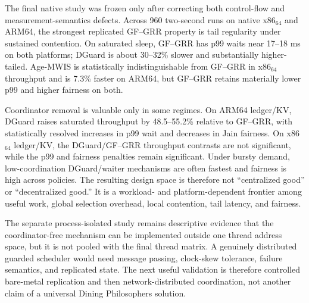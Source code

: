 \documentclass[10pt,journal]{IEEEtran}
\begin{document}
The final native study was frozen only after correcting both control-flow and measurement-semantics defects. Across 960 two-second runs on native x86$_{64}$ and ARM64, the strongest replicated GF--GRR property is tail regularity under sustained contention. On saturated sleep, GF--GRR has p99 waits near 17--18 ms on both platforms; DGuard is about 30--32\% slower and substantially higher-tailed. Age-MWIS is statistically indistinguishable from GF--GRR in x86$_{64}$ throughput and is 7.3\% faster on ARM64, but GF--GRR retains materially lower p99 and higher fairness on both.

Coordinator removal is valuable only in some regimes. On ARM64 ledger/KV, DGuard raises saturated throughput by 48.5--55.2\% relative to GF--GRR, with statistically resolved increases in p99 wait and decreases in Jain fairness. On x86$_{64}$ ledger/KV, the DGuard/GF--GRR throughput contrasts are not significant, while the p99 and fairness penalties remain significant. Under bursty demand, low-coordination DGuard/waiter mechanisms are often fastest and fairness is high across policies. The resulting design space is therefore not ``centralized good'' or ``decentralized good.'' It is a workload- and platform-dependent frontier among useful work, global selection overhead, local contention, tail latency, and fairness.

The separate process-isolated study remains descriptive evidence that the coordinator-free mechanism can be implemented outside one thread address space, but it is not pooled with the final thread matrix. A genuinely distributed guarded scheduler would need message passing, clock-skew tolerance, failure semantics, and replicated state. The next useful validation is therefore controlled bare-metal replication and then network-distributed coordination, not another claim of a universal Dining Philosophers solution.

\balance


\end{document}
